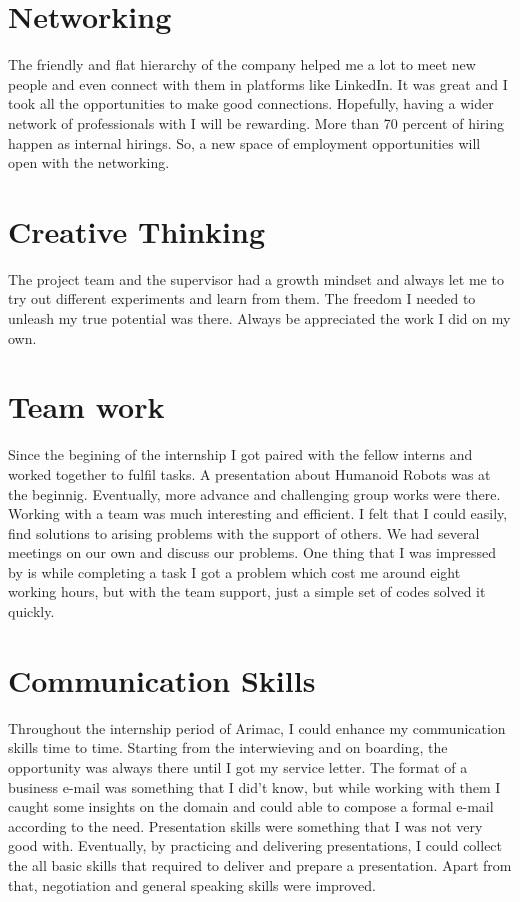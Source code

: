 \documentclass[twoside,12pt,times,onecolumn,a4paper]{report}
\begin{document}
\section{Networking}
The friendly and flat hierarchy of the company helped me a lot to meet new people and even connect with them in platforms like LinkedIn. It was great and I took all the opportunities to make good connections. Hopefully, having a wider network of professionals with I will be rewarding. More than 70 percent of hiring happen as internal hirings. So, a new space of employment opportunities will open with the networking. 

\section{Creative Thinking}
The project team and the supervisor had a growth mindset and always let me to try out different experiments and learn from them. The freedom I needed to unleash my true potential was there. Always be appreciated the work I did on my own. 

\section{Team work}
Since the begining of the internship I got paired with the fellow interns and worked together to fulfil tasks. A presentation about Humanoid Robots was at the beginnig. Eventually, more advance and challenging group works were there. Working with a team was much interesting and efficient. I felt that I could easily, find solutions to arising problems with the support of others. We had several meetings on our own and discuss our problems. One thing that I was impressed by is while completing a task I got a problem which cost me around eight working hours, but with the team support, just a simple set of codes solved it quickly. 

\section{Communication Skills}

Throughout the internship period of Arimac, I could enhance my communication skills time to time. Starting from the interwieving and on boarding, the opportunity was always there until I got my service letter. The format of a business e-mail was something that I did't know, but while working with them I caught some insights on the domain and could able to compose a formal e-mail according to the need. Presentation skills were something that I was not very good with. Eventually, by practicing and delivering presentations, I could collect the all basic skills that required to deliver and prepare a presentation. Apart from that, negotiation and general speaking skills were improved. 
\end{document}
